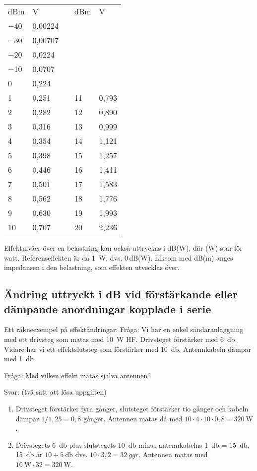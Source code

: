 \begin{center}
\begin{tabular}{l|lp{1cm}l|l}
	dBm & V & & dBm & V \\
	\cline{1-2} \cline{4-5}
	\num{-40} & 0,00224 & & & \\
	\num{-30} & 0,00707 & & & \\
	\num{-20} & 0,0224  & & & \\
	\num{-10} & 0,0707  & & & \\
	0   & 0,224   & & & \\
	1   & 0,251   & & 11 & 0,793 \\
	2   & 0,282   & & 12 & 0,890 \\
	3   & 0,316   & & 13 & 0,999 \\
	4   & 0,354   & & 14 & 1,121 \\
	5   & 0,398   & & 15 & 1,257 \\
	6   & 0,446   & & 16 & 1,411 \\
	7   & 0,501   & & 17 & 1,583 \\
	8   & 0,562   & & 18 & 1,776 \\
	9   & 0,630   & & 19 & 1,993 \\
	10  & 0,707   & & 20 & 2,236
\end{tabular}
\end{center}


\noindent
Effektnivåer över en belastning kan också uttryckas i dB(W), där (W)
står för watt.
Referenseffekten är då \SI{1}{\watt}, dvs. 0\,dB(W).
Liksom med dB(m) anges impedansen i den belastning, som effekten utvecklas över.

\subsection{Ändring uttryckt i dB vid förstärkande eller dämpande anordningar kopplade i serie}

Ett räkneexempel på effektändringar:
Fråga:
Vi har en enkel sändaranläggning med ett drivsteg som matas med \SI{10}{\watt}
HF.
Drivsteget förstärker med \SI{6}{\decibel}.
Vidare har vi ett effektslutsteg som förstärker med \SI{10}{\decibel}.
Antennkabeln dämpar med \SI{1}{\decibel}.

Fråga: Med vilken effekt matas själva antennen?

Svar: (två sätt att lösa uppgiften)
\begin{enumerate}
\item Drivsteget förstärker fyra gånger, slutsteget förstärker tio gånger och
kabeln dämpar \(1/1,25 = 0,8\) gånger. Antennen matas då med
\(10 \cdot 4 \cdot 10 \cdot 0,8 = \SI{320}{\watt}\).
\item Drivstegets \SI{6}{\decibel} plus slutstegets \SI{10}{\decibel} minus antennkabelns \SI{1}{\decibel} = \SI{15}{\decibel}.
\SI{15}{\decibel} är \(10 + \SI{5}{\decibel}\) dvs. \(10 \cdot 3,2 = 32\ ggr\). Antennen matas med
\(\SI{10}{\watt} \cdot 32 = \SI{320}{\watt}\).
\end{enumerate}

